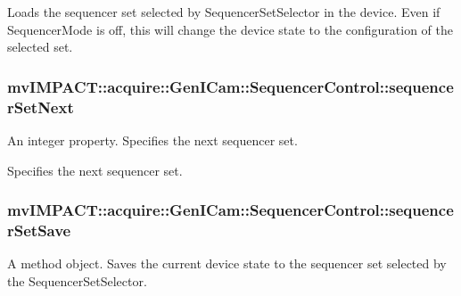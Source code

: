 Loads the sequencer set selected by Sequencer\+Set\+Selector in the device. Even if Sequencer\+Mode is off, this will change the device state to the configuration of the selected set. \hypertarget{classmv_i_m_p_a_c_t_1_1acquire_1_1_gen_i_cam_1_1_sequencer_control_adfee8f4bf16d10c0298e42b9c886cdb1}{
\subsubsection[{sequencer\+Set\+Next}]{ mv\+I\+M\+P\+A\+C\+T\+::acquire\+::\+Gen\+I\+Cam\+::\+Sequencer\+Control\+::sequencer\+Set\+Next}}\label{classmv_i_m_p_a_c_t_1_1acquire_1_1_gen_i_cam_1_1_sequencer_control_adfee8f4bf16d10c0298e42b9c886cdb1}


An integer property. Specifies the next sequencer set. 

Specifies the next sequencer set. \hypertarget{classmv_i_m_p_a_c_t_1_1acquire_1_1_gen_i_cam_1_1_sequencer_control_a16552a61786cbe9280b5ab174997c80a}{
\subsubsection[{sequencer\+Set\+Save}]{ mv\+I\+M\+P\+A\+C\+T\+::acquire\+::\+Gen\+I\+Cam\+::\+Sequencer\+Control\+::sequencer\+Set\+Save}}\label{classmv_i_m_p_a_c_t_1_1acquire_1_1_gen_i_cam_1_1_sequencer_control_a16552a61786cbe9280b5ab174997c80a}


A method object. Saves the current device state to the sequencer set selected by the Sequencer\+Set\+Selector. 

